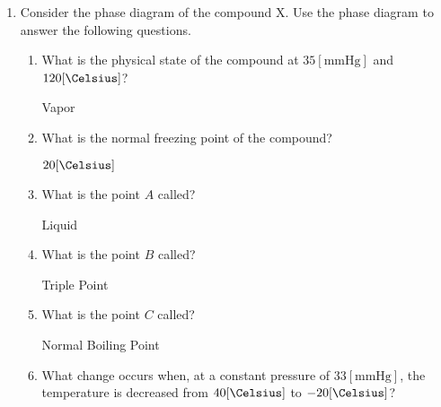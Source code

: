 \documentclass[12pt]{article}
\begin{document}
\begin{enumerate}
\begin{enumerate}
    \end{enumerate}

    \setcounter{enumi}{17}
  
  \item Consider the phase diagram of the compound X. Use the phase diagram to answer the following questions.

    \begin{enumerate}

      \item What is the physical state of the compound at $35[\si{\mmHg}]$ and $120[\si{\Celsius}]$?

        \begin{center}

          Vapor
          
        \end{center}

      \item What is the normal freezing point of the compound?

        \begin{center}

          $20[\si{\Celsius}]$
          
        \end{center}

      \item What is the point $A$ called?

        \begin{center}

          Liquid
          
        \end{center}

      \item What is the point $B$ called?

        \begin{center}

          Triple Point
          
        \end{center}

      \item What is the point $C$ called?

        \begin{center}

          Normal Boiling Point
          
        \end{center}

      \item What change occurs when, at a constant pressure of $33[\si{\mmHg}]$, the temperature is decreased from $40[\si{\Celsius}]$ to $-20[\si{\Celsius}]$?


\end{enumerate}
\end{enumerate}
\end{document}
